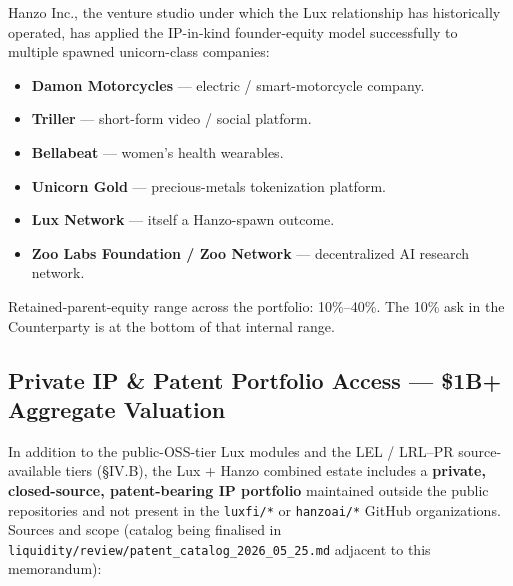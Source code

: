 \documentclass[11pt,letterpaper]{article}
\begin{document}
Hanzo Inc., the venture studio under which the Lux relationship has
historically operated, has applied the IP-in-kind founder-equity
model successfully to multiple spawned unicorn-class companies:

\begin{itemize}[leftmargin=1.5em,itemsep=0.1em]
\item \textbf{Damon Motorcycles} --- electric / smart-motorcycle company.
\item \textbf{Triller} --- short-form video / social platform.
\item \textbf{Bellabeat} --- women's health wearables.
\item \textbf{Unicorn Gold} --- precious-metals tokenization platform.
\item \textbf{Lux Network} --- itself a Hanzo-spawn outcome.
\item \textbf{Zoo Labs Foundation / Zoo Network} --- decentralized AI
research network.
\end{itemize}

Retained-parent-equity range across the portfolio: 10\%--40\%. The
10\% ask in the Counterparty is at the bottom of that internal range.

\subsection*{Private IP \& Patent Portfolio Access --- \$1B+ Aggregate Valuation}

In addition to the public-OSS-tier Lux modules and the LEL / LRL--PR
source-available tiers (\S IV.B), the Lux + Hanzo combined estate
includes a \textbf{private, closed-source, patent-bearing IP
portfolio} maintained outside the public repositories and not
present in the \texttt{luxfi/*} or \texttt{hanzoai/*} GitHub
organizations. Sources and scope (catalog being finalised in
\texttt{liquidity/review/patent\_catalog\_2026\_05\_25.md} adjacent
to this memorandum):
\end{document}
